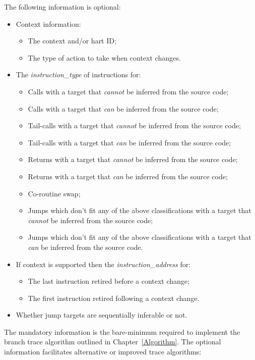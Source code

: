 The following information is optional:

\begin{itemize}
  \item Context information:
    \begin{itemize}
      \item The context and/or hart ID;
      \item The type of action to take when context changes.
    \end{itemize}
  \item The \textit{instruction\_type} of instructions for:
    \begin{itemize}
      \item Calls with a target that \textit{cannot} be inferred from the source code;
      \item Calls with a target that \textit{can} be inferred from the source code;
      \item Tail-calls with a target that \textit{cannot} be inferred from the source code;
      \item Tail-calls with a target that \textit{can} be inferred from the source code;
      \item Returns with a target that \textit{cannot} be inferred from the source code;
      \item Returns with a target that \textit{can} be inferred from the source code;
      \item Co-routine swap;
      \item Jumps which don't fit any of the above classifications with a target that \textit{cannot} be inferred from the source code;
      \item Jumps which don't fit any of the above classifications with a target that \textit{can} be inferred from the source code.
    \end{itemize}
  \item If context is supported then the \textit{instruction\_address} for:
    \begin{itemize}
      \item The last instruction retired before a context change;
      \item The first instruction retired following a context change.
    \end{itemize}
  \item Whether jump targets are sequentially inferable or not.
\end{itemize}

The mandatory information is the bare-minimum required to implement the branch trace algorithm outlined in Chapter~\ref{Algorithm}.  
The optional information facilitates alternative or improved trace algorithms:

